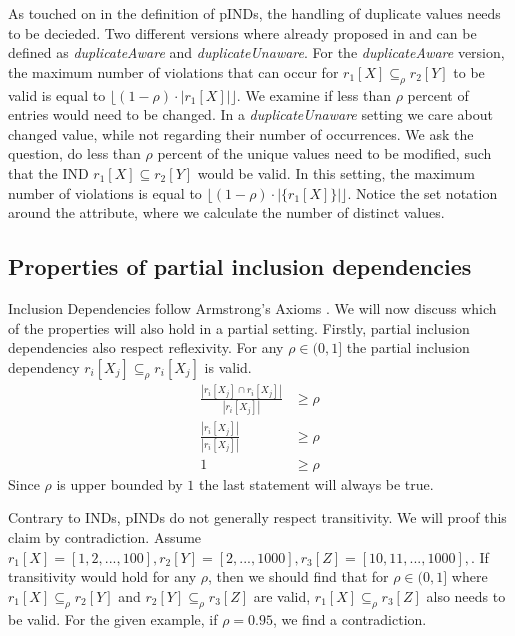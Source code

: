 As touched on in the definition of pINDs, the handling of duplicate values needs to be decieded. Two different versions where already proposed in \cite{bauckmann2006efficiently} and can be defined as \textit{duplicateAware} and \textit{duplicateUnaware}.
For the \textit{duplicateAware} version, the maximum number of violations that can occur for $r_1[X] \subseteq_{\rho} r_2[Y]$ to be valid is equal to $\lfloor (1-\rho) \cdot |r_1[X]| \rfloor$. We examine if less than $\rho$ percent of entries would need to be changed. In a \textit{duplicateUnaware} setting we care about changed value, while not regarding their number of occurrences. We ask the question, do less than $\rho$ percent of the unique values need to be modified, such that the IND $r_1[X] \subseteq r_2[Y]$ would be valid. In this setting, the maximum number of violations is equal to $\lfloor(1-\rho) \cdot |\{r_1[X]\}| \rfloor$. Notice the set notation around the attribute, where we calculate the number of distinct values. \\

\subsection{Properties of partial inclusion dependencies}
Inclusion Dependencies follow Armstrong's Axioms \cite{armstrong2002armstrong}. We will now discuss which of the properties will also hold in a partial setting. Firstly, partial inclusion dependencies also respect reflexivity. For any $\rho \in (0, 1]$ the partial inclusion dependency $r_i[X_j] \subseteq_{\rho} r_i[X_j]$ is valid.
\begin{align*}
    \frac{|r_i[X_j] \cap r_i[X_j]|}
        {|r_i[X_j]|} & \geq \rho \\
    \frac{|r_i[X_j]|}
        {|r_i[X_j]|} & \geq \rho \\
        1 & \geq \rho
 \end{align*}
 Since $\rho$ is upper bounded by $1$ the last statement will always be true.

 Contrary to INDs, pINDs do not generally respect transitivity. We will proof this claim by contradiction. Assume $r_1[X] = [1, 2, ..., 100], r_2[Y] = [2, ..., 1000], r_3[Z] = [10, 11, ..., 1000],$. If transitivity would hold for any $\rho$, then we should find that for $\rho \in (0, 1]$ where $r_1[X] \subseteq_\rho r_2[Y]$ and $ r_2[Y] \subseteq_\rho  r_3[Z]$ are valid, $ r_1[X] \subseteq_\rho  r_3[Z]$ also needs to be valid. For the given example, if $\rho = 0.95$, we find a contradiction.

